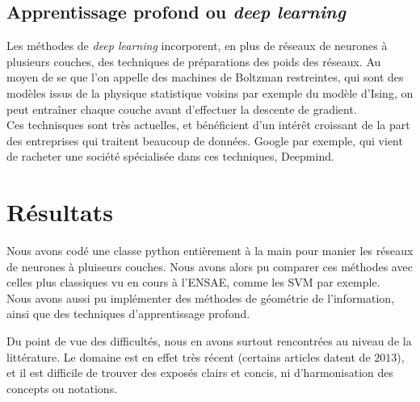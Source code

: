 \documentclass{article}
\begin{document}
\subsection{Apprentissage profond ou \textit{deep learning}}

Les méthodes de \textit{deep learning} incorporent, en plus de réseaux de neurones à plusieurs couches, des techniques de préparations des poids des réseaux. Au moyen de se que l'on appelle des machines de Boltzman restreintes, qui sont des modèles issus de la physique statistique voisins par exemple du modèle d'Ising, on peut entraîner chaque couche avant d'effectuer la descente de gradient.\\

Ces technisques sont très actuelles, et bénéficient d'un intérêt croissant de la part des entreprises qui traitent beaucoup de données. Google par exemple, qui vient de racheter une société spécialisée dans ces techniques, Deepmind.\\

\section{Résultats}

Nous avons codé une classe python entièrement à la main pour manier les réseaux de neurones à pluiseurs couches. Nous avons alors pu comparer ces méthodes avec celles plus classiques vu en cours à l'ENSAE, comme les SVM par exemple.\\

Nous avons aussi pu implémenter des méthodes de géométrie de l'information, ainsi que des techniques d'apprentissage profond. 

Du point de vue des difficultés, nous en avons surtout rencontrées au niveau de la littérature. Le domaine est en effet très récent (certains articles datent de $2013$), et il est difficile de trouver des exposés clairs et concis, ni d'harmonisation des concepts ou notations. \\
\end{document}
